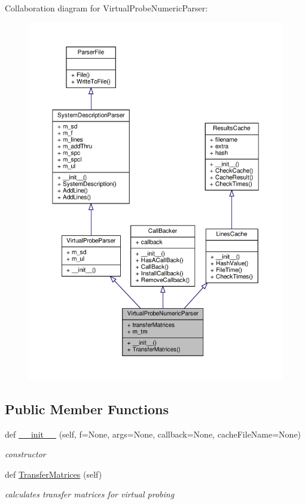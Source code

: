 Collaboration diagram for Virtual\+Probe\+Numeric\+Parser\+:
\nopagebreak
\begin{figure}[H]
\begin{center}
\leavevmode
\includegraphics[width=350pt]{classSignalIntegrity_1_1Parsers_1_1VirtualProbeNumericParser_1_1VirtualProbeNumericParser__coll__graph}
\end{center}
\end{figure}
\subsection*{Public Member Functions}
\begin{DoxyCompactItemize}
\item 
def \hyperlink{classSignalIntegrity_1_1Parsers_1_1VirtualProbeNumericParser_1_1VirtualProbeNumericParser_a5ce77900c33ce9b681aebb5c527ab92a}{\+\_\+\+\_\+init\+\_\+\+\_\+} (self, f=None, args=None, callback=None, cache\+File\+Name=None)
\begin{DoxyCompactList}\small\item\em constructor \end{DoxyCompactList}\item 
def \hyperlink{classSignalIntegrity_1_1Parsers_1_1VirtualProbeNumericParser_1_1VirtualProbeNumericParser_a836e87421e9e21a6676da06625b644b1}{Transfer\+Matrices} (self)
\begin{DoxyCompactList}\small\item\em calculates transfer matrices for virtual probing \end{DoxyCompactList}\end{DoxyCompactItemize}


